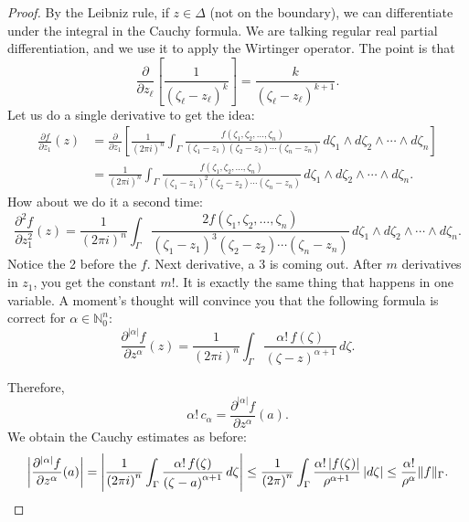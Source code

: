 \documentclass[12pt,openany]{book}
\newcommand{\sabs}[1]{\lvert {#1} \rvert}
\newcommand{\snorm}[1]{\lVert {#1} \rVert}
\newcommand{\abs}[1]{\left\lvert {#1} \right\rvert}
\newcommand{\N}{{\mathbb{N}}}
\theoremstyle{plain}
\theoremstyle{remark}
\theoremstyle{definition}
\theoremstyle{exercise}
\theoremstyle{example}
\begin{document}
\begin{proof}
By the Leibniz rule,
if $z \in \Delta$ (not on the boundary),
we can differentiate under the integral in the Cauchy formula.
We are talking regular real
partial differentiation, and we use it to apply the Wirtinger operator.
The point is that
\begin{equation*}
\frac{\partial}{\partial z_\ell} \left[
\frac{1}{{(\zeta_\ell-z_\ell)}^k} \right]
=
\frac{k}{{(\zeta_\ell-z_\ell)}^{k+1}} .
\end{equation*}
Let us do a single derivative to
get the idea:
\begin{equation*}
\begin{split}
\frac{\partial f}{\partial z_1}(z) &=
\frac{\partial}{\partial z_1} \left[
\frac{1}{{(2\pi i)}^n}
\int_{\Gamma}
\frac{f(\zeta_1,\zeta_2,\ldots,\zeta_n)}{(\zeta_1-z_1)(\zeta_2-z_2)\cdots(\zeta_n-z_n)}
\,
d \zeta_1
\wedge
d \zeta_2
\wedge
\cdots
\wedge
d \zeta_n
\right]
\\
& =
\frac{1}{{(2\pi i)}^n}
\int_{\Gamma}
\frac{f(\zeta_1,\zeta_2,\ldots,\zeta_n)}{{(\zeta_1-z_1)}^2(\zeta_2-z_2)\cdots(\zeta_n-z_n)}
\,
d \zeta_1
\wedge
d \zeta_2
\wedge
\cdots
\wedge
d \zeta_n .
\end{split}
\end{equation*}
How about we do it a second time:
\begin{equation*}
\frac{\partial^2 f}{\partial z_1^2}(z)
=
\frac{1}{{(2\pi i)}^n}
\int_{\Gamma}
\frac{2 f(\zeta_1,\zeta_2,\ldots,\zeta_n)}{{(\zeta_1-z_1)}^3(\zeta_2-z_2)\cdots(\zeta_n-z_n)}
\,
d \zeta_1
\wedge
d \zeta_2
\wedge
\cdots
\wedge
d \zeta_n .
\end{equation*}
Notice the 2 before the $f$.  Next derivative, a 3 is coming out.
After $m$ derivatives in $z_1$, you get the constant $m!$.
It is exactly the same thing that happens in one variable.  A moment's
thought will convince you that the following formula is correct for
$\alpha \in \N_0^n$:
\begin{equation*}
\frac{\partial^{\sabs{\alpha}}f}{\partial z^\alpha} (z) =
\frac{1}{{(2\pi i)}^n}
\int_{\Gamma}
\frac{\alpha! \, f(\zeta)}{{(\zeta-z)}^{\alpha+1}}
\,
d \zeta .
\end{equation*}

Therefore,
\begin{equation*}
\alpha! \, c_\alpha =
\frac{\partial^{\sabs{\alpha}} f}{\partial z^\alpha} (a) .
\end{equation*}
We obtain the Cauchy estimates as before:
\begin{equation*}
\abs{\frac{\partial^{\sabs{\alpha}}f}{\partial z^\alpha}(a)}
=
\abs{
\frac{1}{{(2\pi i)}^n}
\int_{\Gamma}
\frac{\alpha! \, f(\zeta)}{{(\zeta-a)}^{\alpha+1}}
\,
d \zeta }
\leq
\frac{1}{{(2\pi)}^n}
\int_{\Gamma}
\frac{\alpha! \, \sabs{f(\zeta)}}{\rho^{\alpha+1}}
\,
\sabs{d \zeta}
\leq
\frac{\alpha!}{\rho^\alpha}
\snorm{f}_\Gamma . \qedhere
\end{equation*}
\end{proof}
\end{document}
